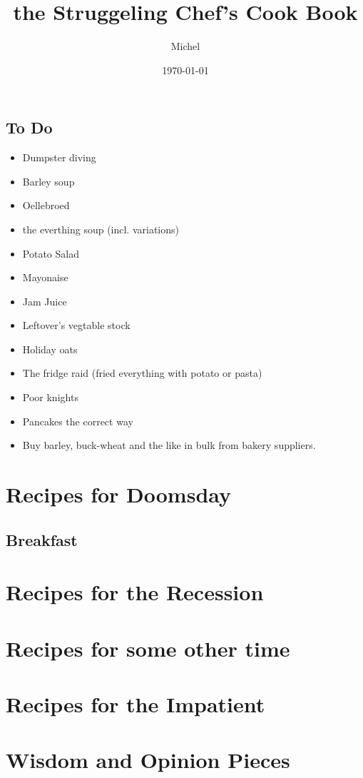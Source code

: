 \documentclass[12pt]{book}
\title{\sc the Struggeling Chef's Cook Book}
\author{Michel}
\date{\today}
\begin{document}
\maketitle
\tableofcontents

\section{To Do}{
    \begin{itemize}
        \item Dumpster diving
        \item Barley soup
        \item Oellebroed
        \item the everthing soup (incl. variations)
        \item Potato Salad
        \item Mayonaise
        \item Jam Juice
        \item Leftover's vegtable stock
        \item Holiday oats
        \item The fridge raid (fried everything with potato or pasta)
        \item Poor knights
        \item Pancakes the correct way
        \item Buy barley, buck-wheat and the like in bulk from bakery suppliers.
    \end{itemize}

}

\clearpage
\chapter{Recipes for Doomsday}
\section{Breakfast}




\chapter{Recipes for the Recession}





\chapter{Recipes for some other time}

%

\chapter{Recipes for the Impatient}


\clearpage

\chapter{\sc Wisdom and Opinion Pieces}

\end{document}
